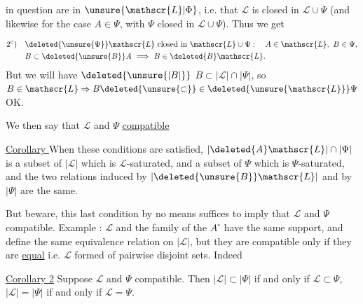 in question are in $\unsure{\mathscr{L}|\Phi}$, i.e. that $\mathscr{L}$ is closed in $\mathscr{L}\cup\Psi$ (and likewise for the case $A\in\Psi$, with $\Psi$ closed in $\mathscr{L}\cup\Psi$). Thus we get

\[
\begin{aligned}
2^{\circ})\quad &\deleted{\unsure{\Psi}}\mathscr{L}\ \text{closed in }\mathscr{L}\cup\Psi:\quad A\in\mathscr{L},\ B\in\Psi,\\
&B\subset\deleted{\unsure{B}}A\ \Longrightarrow\ B\in\deleted{B}\mathscr{L}.
\end{aligned}
\]
But we will have $\deleted{\unsure{\lvert B\rvert}}$ $B\subset\lvert\mathscr{L}\rvert\cap\lvert\Psi\rvert$, so $B\in\mathscr{L}\Rightarrow B\deleted{\unsure{\subset}}\in\deleted{\unsure{\mathscr{L}}}\Psi$ OK.

\uline{} We then say that $\mathscr{L}$ and $\Psi$ \uline{compatible}

\uline{Corollary } When these conditions are satisfied, $\lvert\deleted{A}\mathscr{L}\rvert\cap\lvert\Psi\rvert$ is a subset of $\lvert\mathscr{L}\rvert$ which is $\mathscr{L}$-saturated, and a subset of $\Psi$ which is $\Psi$-saturated, and the two  relations induced by $\lvert\deleted{\unsure{B}}\mathscr{L}\rvert$ and by $\lvert\Psi\rvert$ are the same.

But beware, this last condition by no means suffices to imply that $\mathscr{L}$ and $\Psi$ compatible. Example : $\mathscr{L}$ and the family  of the $A^{\circ}$ have the same support, and define the same equivalence relation on $\lvert\mathscr{L}\rvert$, but they are compatible only if they are \uline{equal}  i.e. $\mathscr{L}$ formed of pairwise disjoint sets. Indeed 

\uline{Corollary 2} Suppose $\mathscr{L}$ and $\Psi$ compatible. Then $\lvert\mathscr{L}\rvert\subset\lvert\Psi\rvert$ if and only if $\mathscr{L}\subset\Psi$, $\lvert\mathscr{L}\rvert=\lvert\Psi\rvert$ if and only if $\mathscr{L}=\Psi$.
